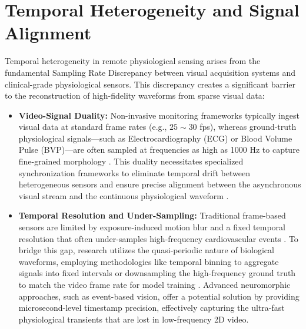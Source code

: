 \section{Temporal Heterogeneity and Signal Alignment}
\label{sec:temporal-heterogeneity}
Temporal heterogeneity in remote physiological sensing arises from the
fundamental Sampling Rate Discrepancy between visual acquisition systems and
clinical-grade physiological sensors. This discrepancy creates a significant barrier
to the reconstruction of high-fidelity waveforms from sparse visual data:

\begin{itemize}
    \item \textbf{Video-Signal Duality:} Non-invasive monitoring frameworks
        typically ingest visual data at standard frame rates (e.g., $25 \sim 30$
        fps), whereas ground-truth physiological signals—such as Electrocardiography
        (ECG) or Blood Volume Pulse (BVP)—are often sampled at frequencies as
        high as 1000 Hz to capture fine-grained morphology
        \cite{feghoul2026deep}. This duality necessitates specialized synchronization
        frameworks to eliminate temporal drift between heterogeneous sensors and
        ensure precise alignment between the asynchronous visual stream and the continuous
        physiological waveform \cite{feng2026empd}.

    \item \textbf{Temporal Resolution and Under-Sampling:} Traditional
        frame-based sensors are limited by exposure-induced motion blur and a fixed
        temporal resolution that often under-samples high-frequency cardiovascular
        events \cite{feng2026empd, cheng2026fcus}. To bridge this gap, research
        utilizes the quasi-periodic nature of biological waveforms, employing methodologies
        like temporal binning to aggregate signals into fixed intervals or downsampling
        the high-frequency ground truth to match the video frame rate for model training
        \cite{feghoul2026deep}. Advanced neuromorphic approaches,
        such as event-based vision, offer a potential solution by providing microsecond-level
        timestamp precision, effectively capturing the ultra-fast physiological
        transients that are lost in low-frequency 2D video.
\end{itemize}

